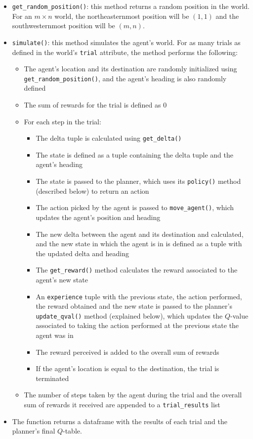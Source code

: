 \documentclass{article}
\begin{document}
\begin{itemize}
    \item \texttt{get\_random\_position()}: this method returns a random position in the world. For an $m\times n$ world, the northeasternmost position will be $(1, 1)$ and the southwesternmost position will be $(m, n)$.

    \item \texttt{simulate()}: this method simulates the agent's world. For as many trials as defined in the world's \texttt{trial} attribute, the method performs the following:
    
    \begin{itemize}
        \item The agent's location and its destination are randomly initialized using \texttt{get\-\_random\-\_position()}, and the agent's heading is also randomly defined
        \item The sum of rewards for the trial is defined as 0
        \item For each step in the trial:
        
        \begin{itemize}
            \item The delta tuple is calculated using \texttt{get\_delta()}
            \item The state is defined as a tuple containing the delta tuple and the agent's heading
            \item The state is passed to the planner, which uses its \texttt{policy()} method (described below) to return an action
            \item The action picked by the agent is passed to \texttt{move\_agent()}, which updates the agent's position and heading
            \item The new delta between the agent and its destination and calculated, and the new state in which the agent is in is defined as a tuple with the updated delta and heading
            \item The \texttt{get\_reward()} method calculates the reward associated to the agent's new state
            \item An \texttt{experience} tuple with the previous state, the action performed, the reward obtained and the new state is passed to the planner's \texttt{update\_qval()} method (explained below), which updates the $Q$-value associated to taking the action performed at the previous state the agent was in
            \item The reward perceived is added to the overall sum of rewards
            \item If the agent's location is equal to the destination, the trial is terminated
        \end{itemize}
        
        \item The number of steps taken by the agent during the trial and the overall sum of rewards it received are appended to a \texttt{trial\_results} list
    \end{itemize}
    
    \item[] The function returns a dataframe with the results of each trial and the planner's final $Q$-table.
\end{itemize}
\end{document}
